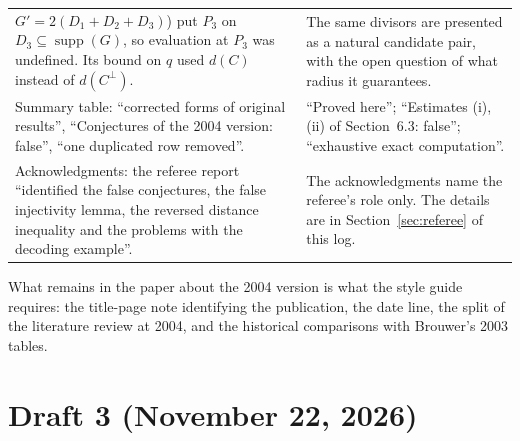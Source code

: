\documentclass[12pt,letterpaper]{article}
\DeclareMathOperator{\supp}{supp}
\begin{document}
\begin{longtable}{@{}L{0.47\textwidth}L{0.45\textwidth}@{}}
$G'=2(D_1+D_2+D_3)$) put $P_3$ on $D_3\subseteq\supp(G)$, so evaluation at
$P_3$ was undefined. Its bound on $q$ used $d(C)$ instead of $d(C^\perp)$. &
The same divisors are presented as a natural candidate pair, with the open
question of what radius it guarantees.\\
Summary table: ``corrected forms of original results'', ``Conjectures of the
2004 version: false'', ``one duplicated row removed''. & ``Proved here'';
``Estimates (i), (ii) of Section~6.3: false''; ``exhaustive exact
computation''.\\
Acknowledgments: the referee report ``identified the false conjectures, the
false injectivity lemma, the reversed distance inequality and the problems
with the decoding example''. & The acknowledgments name the referee's role
only. The details are in Section~\ref{sec:referee} of this log.\\
\bottomrule
\end{longtable}

What remains in the paper about the 2004 version is what the style guide
requires: the title-page note identifying the publication, the date line,
the split of the literature review at 2004, and the historical comparisons
with Brouwer's 2003 tables.

\section{Draft 3 (November 22, 2026)}\label{sec:draft3}
\end{document}
